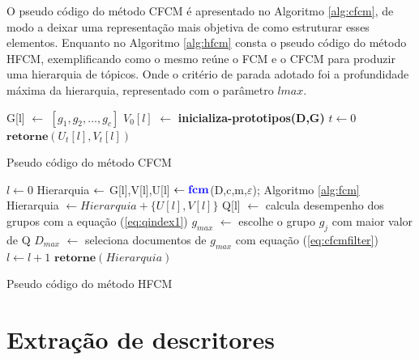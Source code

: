 O pseudo código do método CFCM é apresentado no Algoritmo \ref{alg:cfcm}, de modo a deixar uma
representação mais objetiva de como estruturar esses elementos. Enquanto no 
Algoritmo \ref{alg:hfcm} consta o
pseudo código do método HFCM, exemplificando como o mesmo reúne o FCM e o CFCM para produzir uma
hierarquia de tópicos. Onde o critério de parada adotado foi a profundidade máxima da hierarquia,
representado com o parâmetro $lmax$.

\begin{algorithm}[!htp] 
  \SetAlgoLined {} 
  G[l] $\gets$ $[g_1,g_2,...,g_c]$\; 
  $V_0[l]$ $\gets$ \textbf{{\color{blue}inicializa-prototipos}(D,G)}\; 
  $t \gets 0$\; 
  $\textbf{retorne} (U_t[l],V_t[l])$\; 
  \caption{Pseudo código do método CFCM}
  \label{alg:cfcm} 
\end{algorithm}

\begin{algorithm}[!htp]
  \SetAlgoLined {} 
  $l \gets 0$\; 
  Hierarquia $\gets \empty$
  G[l],V[l],U[l] $\gets \textbf{{\color{blue}fcm}}$(D,c,m,$\varepsilon$); Algoritmo \ref{alg:fcm}\; 
  Hierarquia $\gets Hierarquia + \{U[l],V[l]\}$\;
  Q[l] $\gets$ calcula desempenho dos grupos com a equação (\ref{eq:qindex1})\;
  $g_{max}$ $\gets$ escolhe o grupo $g_j$ com maior valor de Q\;
  $D_{max}$ $\gets$ seleciona documentos de $g_{max}$ com equação (\ref{eq:cfcmfilter})\;
  $l \gets l + 1$\; 
  $\textbf{retorne} (Hierarquia)$\; 
  \caption{Pseudo código do método HFCM}
  \label{alg:hfcm} 
\end{algorithm}

\section{Extração de descritores} 

